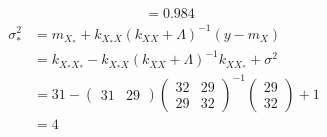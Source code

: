 \begin{itemize}
\begin{align*}
            &= 0.984
\end{align*}
\begin{align*}
    \sigma^2_*      &= m_{X_*}+k_{X_*X}(k_{XX}+\Lambda)^{-1}(y-m_X) \\
                    &= k_{X_*X_*}-k_{X_*X}(k_{XX}+\Lambda)^{-1}k_{XX_*}+\sigma^2\\
                    &=31 - \begin{pmatrix}
                        31 & 29
                        \end{pmatrix} 
                        \begin{pmatrix}
                        32 & 29\\
                        29 & 32
                        \end{pmatrix}^{-1}\begin{pmatrix}
                            29 \\
                            32 
                        \end{pmatrix} +1 \\
                    &= 4
\end{align*}
\end{itemize}